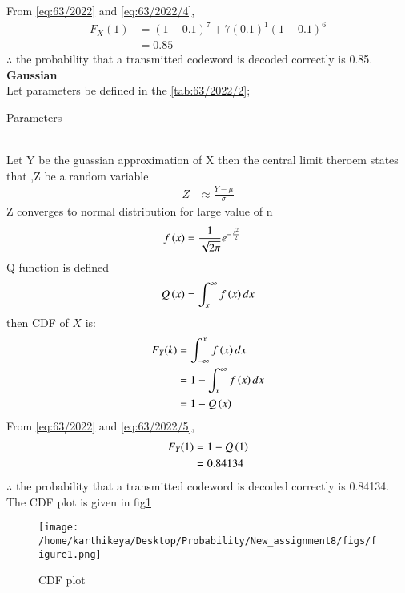 \documentclass[article]{IEEEtran}
\theoremstyle{remark}
\begin{document}
From \eqref{eq:63/2022} and \eqref{eq:63/2022/4}, 
\begin{align}
    F_X(1) &= (1-0.1)^{7}+7(0.1)^1(1-0.1)^{6} \\
    &= 0.85
\end{align}
$\therefore$ the probability that a transmitted codeword is decoded correctly is 0.85.
\newpage
\textbf{Gaussian}\\
Let parameters be defined in the \autoref{tab:63/2022/2};
\begin{table}[h]
	\centering
	
	\caption{Parameters}
        \label{tab:63/2022/2}
\end{table}
\\Let Y be the guassian approximation of X then the central limit theroem states that ,Z be a random variable
\begin{align}
	Z&\approx\frac{Y- \mu}{\sigma}
\end{align}
Z converges to normal distribution for large value of n
\begin{align}
	f\left(x\right)&=\frac{1}{\sqrt{2\pi}}e^{-\frac{x^2}{2}}
\end{align}
Q function is defined
\begin{align}
	Q\left(x\right)=\int_x^{\infty}f\left(x\right)dx
\end{align}
then CDF of $X$ is:
\begin{align}
	F_Y(k)&=\int_{-\infty}^x f\left(x\right) dx\\
	&=1-\int_x^{\infty}f\left(x\right)dx\\
	&=1-Q\left(x\right) \label{eq:63/2022/5}
\end{align}
From \eqref{eq:63/2022} and \eqref{eq:63/2022/5}, 
\begin{align}
	F_Y(1)&=1-Q\left(1\right) \\
	&= 0.84134
\end{align}
$\therefore$ the probability that a transmitted codeword is decoded correctly is 0.84134.
The CDF plot is given in fig\ref{fig:63/2022}
\begin{figure}[ht!]
    \centering
    \texttt{[image: /home/karthikeya/Desktop/Probability/New\_assignment8/figs/figure1.png]}
    \caption{CDF plot}
    \label{fig:63/2022}
\end{figure}
\end{document}
